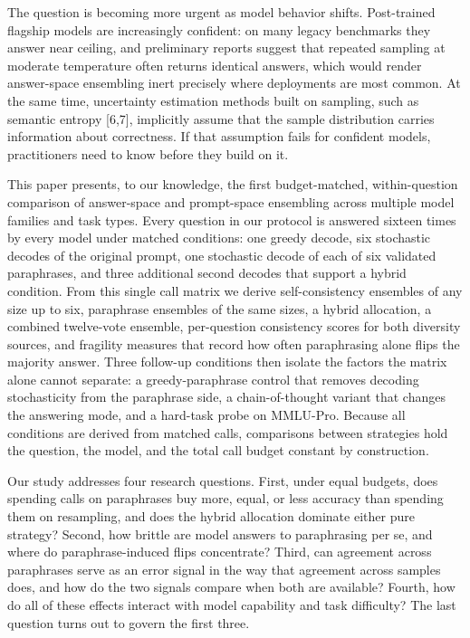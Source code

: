 \documentclass[preprint,12pt]{elsarticle}
\begin{document}
The question is becoming more urgent as model behavior shifts. Post-trained flagship models are increasingly confident: on many legacy benchmarks they answer near ceiling, and preliminary reports suggest that repeated sampling at moderate temperature often returns identical answers, which would render answer-space ensembling inert precisely where deployments are most common. At the same time, uncertainty estimation methods built on sampling, such as semantic entropy [6,7], implicitly assume that the sample distribution carries information about correctness. If that assumption fails for confident models, practitioners need to know before they build on it.

This paper presents, to our knowledge, the first budget-matched, within-question comparison of answer-space and prompt-space ensembling across multiple model families and task types. Every question in our protocol is answered sixteen times by every model under matched conditions: one greedy decode, six stochastic decodes of the original prompt, one stochastic decode of each of six validated paraphrases, and three additional second decodes that support a hybrid condition. From this single call matrix we derive self-consistency ensembles of any size up to six, paraphrase ensembles of the same sizes, a hybrid allocation, a combined twelve-vote ensemble, per-question consistency scores for both diversity sources, and fragility measures that record how often paraphrasing alone flips the majority answer. Three follow-up conditions then isolate the factors the matrix alone cannot separate: a greedy-paraphrase control that removes decoding stochasticity from the paraphrase side, a chain-of-thought variant that changes the answering mode, and a hard-task probe on MMLU-Pro. Because all conditions are derived from matched calls, comparisons between strategies hold the question, the model, and the total call budget constant by construction.

Our study addresses four research questions. First, under equal budgets, does spending calls on paraphrases buy more, equal, or less accuracy than spending them on resampling, and does the hybrid allocation dominate either pure strategy? Second, how brittle are model answers to paraphrasing per se, and where do paraphrase-induced flips concentrate? Third, can agreement across paraphrases serve as an error signal in the way that agreement across samples does, and how do the two signals compare when both are available? Fourth, how do all of these effects interact with model capability and task difficulty? The last question turns out to govern the first three.
\end{document}
